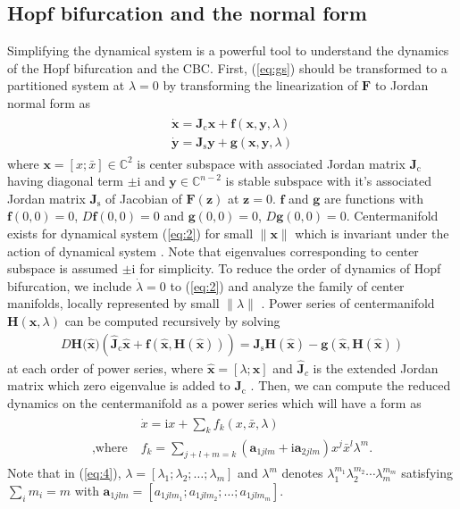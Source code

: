 \documentclass[openacc]{rsproca_new}%
\def\complex{\mathbb{C}}
\def\vec#1{\ensuremath{\mathbf{#1}}}
\newcommand{\Eref}[1]{(\ref{#1})}
\begin{document}
\subsection{Hopf bifurcation and the normal form}\label{SNF}

Simplifying the dynamical system is a powerful tool to understand the dynamics of the Hopf bifurcation and the CBC. First, \Eref{eq:gs} should be transformed to a partitioned system at \(\lambda=0\) by transforming the linearization of \(\vec{F}\) to Jordan normal form as
\begin{align}\label{eq:2}
  \begin{split}
    \dot{\vec{x}} =\vec{J}_\textrm{c} \vec{x} + \vec{f}(\vec{x},\vec{y},\lambda)\\
    \dot{\vec{y}} =\vec{J}_\textrm{s} \vec{y} +\vec{g}(\vec{x},\vec{y},\lambda)
  \end{split}
\end{align}
where $\vec{x}=[x;\bar{x}]\in \complex^2$ is center subspace with associated Jordan matrix $\vec{J}_\textrm{c}$ having diagonal term $\pm\textrm{i}$ and $\vec{y}\in \complex^{n-2}$ is stable subspace with it's associated Jordan matrix $\vec{J}_\textrm{s}$ of Jacobian of $\vec{F}(\vec{z})$ at $\vec{z}=0$.
$\vec{f}$ and $\vec{g}$ are functions with $\vec{f}(0,0)=0$, $D\vec{f}(0,0)=0$ and $\vec{g}(0,0)=0$, $D\vec{g}(0,0)=0$. Centermanifold exists for dynamical system \Eref{eq:2} for small  $\|\vec{x}\|$ which is invariant under the action of dynamical system \cite{carr2012applications}. Note that eigenvalues corresponding to center subspace is assumed $\pm\textrm{i}$ for simplicity. To reduce the order of dynamics of Hopf bifurcation, we include $\dot\lambda=0$ to \Eref{eq:2} and analyze the family of center manifolds, locally represented by small $\|\lambda\|$  \cite{kuznetsov2013elements}. Power series of centermanifold $\vec{H}(\vec{x},\lambda)$ can be computed recursively by solving
\begin{align}\label{eq:3}
    D\vec{H}({\vec{\hat{x})}}(\vec{\hat{J}}_\textrm{c}\vec{\hat{x}}+\vec{f}(\vec{\hat{x}},\vec{H}(\vec{\hat{x}}))) =\vec{J}_\textrm{s} \vec{H}(\vec{\hat{x}})-\vec{g}(\vec{\hat{x}},\vec{H}(\vec{\hat {x}}))
\end{align}
at each order of power series, where \(\vec{\hat{x}}=[\lambda;\vec{x}]\) and \(\vec{\hat{J}}_c\) is the extended Jordan matrix which zero eigenvalue is added to \(\vec{J}_\textrm{c}\) \cite{bi1999symbolic}. Then, we can compute the reduced dynamics on the centermanifold as a power series which will have a form as
\begin{align}\label{eq:4}
  \begin{split}
    {}&\dot{x} =\textrm{i} x+\sum_k f_k(x,\bar{x},\lambda)\\
    ,\textrm{where} \; & f_k=\sum_{j+l+m=k}(\vec{a}_{1jlm}+\textrm{i}\vec{a}_{2jlm})x^j\bar{x}^l\lambda^m.
  \end{split}
\end{align}
Note that in \Eref{eq:4}, \(\lambda=[\lambda_1;\lambda_2;\ldots;\lambda_m]\) and \(\lambda^m\) denotes \(\lambda_1^{m_1}\lambda_2^{m_2}\cdots\lambda_m^{m_m}\) satisfying \(\sum_i m_i = m\) with \(\vec{a}_{1jlm}=[a_{1jlm_1};a_{1jlm_2};\ldots;a_{1jlm_m}]\).
\end{document}
